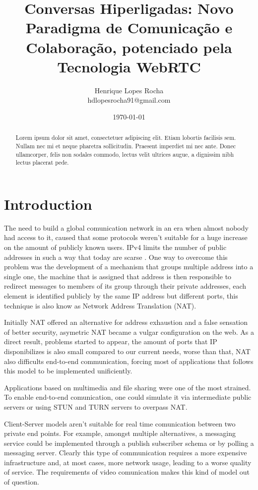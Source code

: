 \documentclass[11pt,twocolumn]{article}
\title{Conversas Hiperligadas: Novo Paradigma de Comunicação e Colaboração, potenciado pela Tecnologia WebRTC}
\author{
	Henrique Lopes Rocha \\ hdlopesrocha91@gmail.com
}
\date{\today}
\begin{document}
\begingroup
\let\onecolumn\twocolumn

	\maketitle


\begin{abstract}
Lorem ipsum dolor sit amet, consectetuer adipiscing elit. Etiam lobortis facilisis sem. Nullam nec mi et neque pharetra sollicitudin. Praesent imperdiet mi nec ante. Donec ullamcorper, felis non sodales commodo, lectus velit ultrices augue, a dignissim nibh lectus placerat pede.
\end{abstract}

\endgroup


\section{Introduction}
The need to build a global comunication network in an era when almost nobody had access to it, caused that some protocols weren't suitable for a huge increase on the amount of publicly known users. IPv4 limits the number of public addresses in such a way that today are scarse \cite{ipv4}. One way to overcome this problem was the development of a mechanism that groups multiple address into a single one, the machine that is assigned that address is then responsible to redirect messages to members of its group through their private addresses, each element is identified publicly by the same IP address but different ports, this technique is also know as Network Address Translation (NAT).

Initially NAT offered an alternative for address exhaustion and a false sensation of better security, asymetric NAT became a vulgar configuration on the web. As a direct result, problems started to appear, the amount of ports that IP disponibilizes is also small compared to our current needs, worse than that, NAT also difficults end-to-end communication, forcing most of applications that follows this model to be implemented unificiently.

Applications based on multimedia and file sharing were one of the most strained. To enable end-to-end comunication, one could simulate it via intermediate public servers or using STUN and TURN servers to overpass NAT. 

Client-Server models aren't suitable for real time comunication between two private end points. For example, amongst multiple alternatives, a messaging service could be implemented through a publish subscriber schema or by polling a messaging server. Clearly this type of communication requires a more expensive infrastructure and, at most cases, more network usage, leading to a worse quality of service. The requirements of video comunication makes this kind of model out of question.
\end{document}
